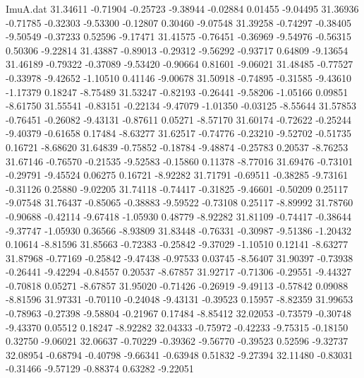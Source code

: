 \begin{filecontents}{ImuA.dat}
  31.34611   -0.71904   -0.25723   -9.38944   -0.02884    0.01455   -9.04495
  31.36936   -0.71785   -0.32303   -9.53300   -0.12807    0.30460   -9.07548
  31.39258   -0.74297   -0.38405   -9.50549   -0.37233    0.52596   -9.17471
  31.41575   -0.76451   -0.36969   -9.54976   -0.56315    0.50306   -9.22814
  31.43887   -0.89013   -0.29312   -9.56292   -0.93717    0.64809   -9.13654
  31.46189   -0.79322   -0.37089   -9.53420   -0.90664    0.81601   -9.06021
  31.48485   -0.77527   -0.33978   -9.42652   -1.10510    0.41146   -9.00678
  31.50918   -0.74895   -0.31585   -9.43610   -1.17379    0.18247   -8.75489
  31.53247   -0.82193   -0.26441   -9.58206   -1.05166    0.09851   -8.61750
  31.55541   -0.83151   -0.22134   -9.47079   -1.01350   -0.03125   -8.55644
  31.57853   -0.76451   -0.26082   -9.43131   -0.87611    0.05271   -8.57170
  31.60174   -0.72622   -0.25244   -9.40379   -0.61658    0.17484   -8.63277
  31.62517   -0.74776   -0.23210   -9.52702   -0.51735    0.16721   -8.68620
  31.64839   -0.75852   -0.18784   -9.48874   -0.25783    0.20537   -8.76253
  31.67146   -0.76570   -0.21535   -9.52583   -0.15860    0.11378   -8.77016
  31.69476   -0.73101   -0.29791   -9.45524    0.06275    0.16721   -8.92282
  31.71791   -0.69511   -0.38285   -9.73161   -0.31126    0.25880   -9.02205
  31.74118   -0.74417   -0.31825   -9.46601   -0.50209    0.25117   -9.07548
  31.76437   -0.85065   -0.38883   -9.59522   -0.73108    0.25117   -8.89992
  31.78760   -0.90688   -0.42114   -9.67418   -1.05930    0.48779   -8.92282
  31.81109   -0.74417   -0.38644   -9.37747   -1.05930    0.36566   -8.93809
  31.83448   -0.76331   -0.30987   -9.51386   -1.20432    0.10614   -8.81596
  31.85663   -0.72383   -0.25842   -9.37029   -1.10510    0.12141   -8.63277
  31.87968   -0.77169   -0.25842   -9.47438   -0.97533    0.03745   -8.56407
  31.90397   -0.73938   -0.26441   -9.42294   -0.84557    0.20537   -8.67857
  31.92717   -0.71306   -0.29551   -9.44327   -0.70818    0.05271   -8.67857
  31.95020   -0.71426   -0.26919   -9.49113   -0.57842    0.09088   -8.81596
  31.97331   -0.70110   -0.24048   -9.43131   -0.39523    0.15957   -8.82359
  31.99653   -0.78963   -0.27398   -9.58804   -0.21967    0.17484   -8.85412
  32.02053   -0.73579   -0.30748   -9.43370    0.05512    0.18247   -8.92282
  32.04333   -0.75972   -0.42233   -9.75315   -0.18150    0.32750   -9.06021
  32.06637   -0.70229   -0.39362   -9.56770   -0.39523    0.52596   -9.32737
  32.08954   -0.68794   -0.40798   -9.66341   -0.63948    0.51832   -9.27394
  32.11480   -0.83031   -0.31466   -9.57129   -0.88374    0.63282   -9.22051

\end{filecontents}
